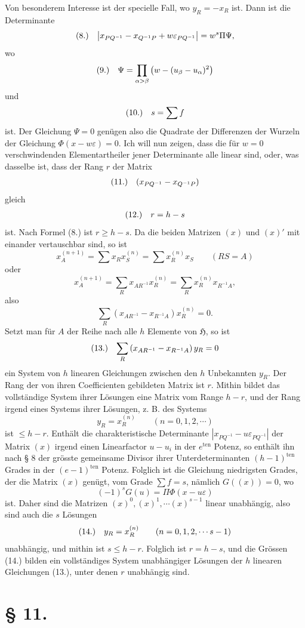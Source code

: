 \documentclass[11pt]{article}
\makeatletter
\newcommand{\Hgrp}{\mathfrak{H}}
\newcommand{\frobtagc}[2]{\[\begin{array}{@{}r@{\quad}c@{}}\textup{(#1)} & \displaystyle #2\end{array}\]}
\makeatother
\begin{document}
Von besonderem Interesse ist der specielle Fall, wo $y_R=-x_R$ ist. Dann ist die Determinante
\frobtagc{8.}{\left|x_{PQ^{-1}}-x_{Q^{-1}P}+w\varepsilon_{PQ^{-1}}\right|=w^s\Pi\Psi,}
wo
\frobtagc{9.}{\Psi=\prod_{\alpha>\beta}\left(w-(u_\beta-u_\alpha)^2\right)}
und
\frobtagc{10.}{s=\sum f}
ist. Der Gleichung $\Psi=0$ genügen also die Quadrate der Differenzen der Wurzeln der Gleichung $\Phi(x-w\varepsilon)=0$. Ich will nun zeigen, dass die für $w=0$ verschwindenden Elementartheiler jener Determinante alle linear sind, oder, was dasselbe ist, dass der Rang $r$ der Matrix
\frobtagc{11.}{(x_{PQ^{-1}}-x_{Q^{-1}P})}
gleich
\frobtagc{12.}{r=h-s}
ist. Nach Formel (8.) ist $r\ge h-s$. Da die beiden Matrizen $(x)$ und $(x)'$ mit einander vertauschbar sind, so ist
\[
x_A^{(n+1)}=\sum x_Rx_S^{(n)}=\sum x_R^{(n)}x_S\qquad (RS=A)
\]
oder
\[
x_A^{(n+1)}=\sum_R x_{AR^{-1}}x_R^{(n)}=\sum_R x_R^{(n)}x_{R^{-1}A},
\]
also
\[
\sum_R\left(x_{AR^{-1}}-x_{R^{-1}A}\right)x_R^{(n)}=0.
\]
Setzt man für $A$ der Reihe nach alle $h$ Elemente von $\Hgrp$, so ist
\frobtagc{13.}{\sum_R\left(x_{AR^{-1}}-x_{R^{-1}A}\right)y_R=0}
ein System von $h$ linearen Gleichungen zwischen den $h$ Unbekannten $y_R$. Der Rang der von ihren Coefficienten gebildeten Matrix ist $r$. Mithin bildet das vollständige System ihrer Lösungen eine Matrix vom Range $h-r$, und der Rang irgend eines Systems ihrer Lösungen, z. B. des Systems
\[
y_R=x_R^{(n)}\qquad (n=0,1,2,\cdots)
\]
ist $\le h-r$. Enthält die charakteristische Determinante $\left|x_{PQ^{-1}}-u\varepsilon_{PQ^{-1}}\right|$ der Matrix $(x)$ irgend einen Linearfactor $u-u_i$ in der $e^{\mathrm{ten}}$ Potenz, so enthält ihn nach § 8 der grösste gemeinsame Divisor ihrer Unterdeterminanten $(h-1)^{\mathrm{ten}}$ Grades in der $(e-1)^{\mathrm{ten}}$ Potenz. Folglich ist die Gleichung niedrigsten Grades, der die Matrix $(x)$ genügt, vom Grade $\sum f=s$, nämlich $G((x))=0$, wo
\[
(-1)^sG(u)=\Pi\Phi(x-u\varepsilon)
\]
ist. Daher sind die Matrizen $(x)^0,(x)^1,\cdots(x)^{s-1}$ linear unabhängig, also sind auch die $s$ Lösungen
\frobtagc{14.}{y_R=x_R^{(n)}\qquad (n=0,1,2,\cdots s-1)}
unabhängig, und mithin ist $s\le h-r$. Folglich ist $r=h-s$, und die Grössen (14.) bilden ein vollständiges System unabhängiger Lösungen der $h$ linearen Gleichungen (13.), unter denen $r$ unabhängig sind.

\section*{§ 11.}
\end{document}

